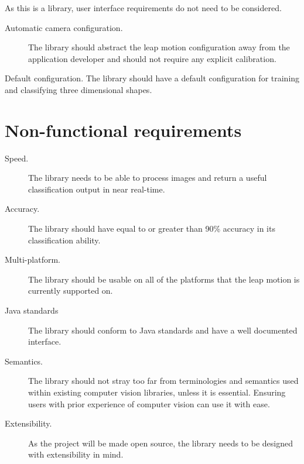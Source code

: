 \documentclass[11pt,oneside]{report}
\begin{document}
			As this is a library, user interface requirements do not need to be considered.
			\begin{description}
				\item[Automatic camera configuration.] The library should abstract the leap motion configuration away from the application developer and should not require any explicit calibration.
			\end{description}
				\item[Default configuration.] The library should have a default configuration for training and classifying three dimensional shapes.
			
		\section{Non-functional requirements}
			\begin{description}
				\item[Speed.] The library needs to be able to process images and return a useful classification output in near real-time.
				\item[Accuracy.] The library should have equal to or greater than 90\% accuracy in its classification ability.
				\item[Multi-platform.] The library should be usable on all of the platforms that the leap motion is currently supported on.
				\item[Java standards] The library should conform to Java standards and have a well documented interface.
				\item[Semantics.] The library should not stray too far from terminologies and semantics used within existing computer vision libraries, unless it is essential. Ensuring users with prior experience of computer vision can use it with ease.
				\item[Extensibility.] As the project will be made open source, the library needs to be designed with extensibility in mind.
			\end{description}
			
\end{document}
